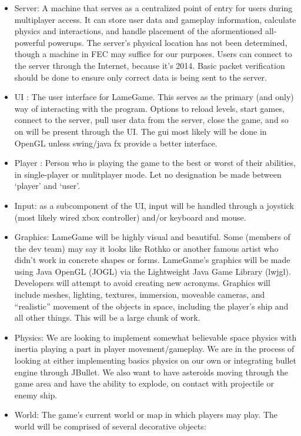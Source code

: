 \documentclass[titlepage]{article}\usepackage[]{graphicx}\usepackage[]{color}
\begin{document}
\begin{itemize}
\item
  Server: A machine that serves as a centralized point of entry for
  users during multiplayer access. It can store user data and gameplay
  information, calculate physics and interactions, and handle placement
  of the aformentioned all-powerful powerups. The server's physical
  location has not been determined, though a machine in FEC may suffice
  for our purposes. Users can connect to the server through the
  Internet, because it's 2014. Basic packet verification should be done
  to ensure only correct data is being sent to the server.
\item
  UI : The user interface for LameGame. This serves as the primary (and
  only) way of interacting with the program. Options to reload levels,
  start games, connect to the server, pull user data from the server,
  close the game, and so on will be present through the UI. The gui most
  likely will be done in OpenGL unless swing/java fx provide a better
  interface.
\item
  Player : Person who is playing the game to the best or worst of their
  abilities, in single-player or mulitplayer mode. Let no designation be
  made between `player' and `user'.
\item
  Input: as a subcomponent of the UI, input will be handled through a
  joystick (most likely wired xbox controller) and/or keyboard and
  mouse.
\item
  Graphics: LameGame will be highly visual and beautiful. Some (members
  of the dev team) may say it looks like Rothko or another famous artist
  who didn't work in concrete shapes or forms. LameGame's graphics will
  be made using Java OpenGL (JOGL) via the Lightweight Java Game Library
  (lwjgl). Developers will attempt to avoid creating new acronyms.
  Graphics will include meshes, lighting, textures, immersion, moveable
  cameras, and ``realistic'' movement of the objects in space, including
  the player's ship and all other things. This will be a large chunk of
  work.
\item
  Physics: We are looking to implement somewhat believable space physics
  with inertia playing a part in player movement/gameplay. We are in the
  process of looking at either implementing basics physics on our own or
  integrating bullet engine through JBullet. We also want to have
  asteroids moving through the game area and have the ability to
  explode, on contact with projectile or enemy ship.
\item
  World: The game's current world or map in which players may play. The
  world will be comprised of several decorative objects:


\end{itemize}
\end{document}
